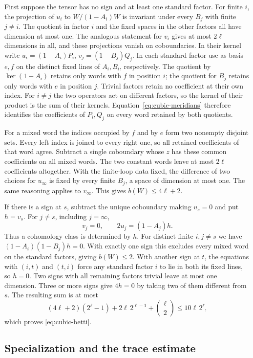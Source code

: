 \documentclass[preprint,12pt,numbers]{elsarticle}
\begin{document}
First suppose the tensor has no sign and at least one standard factor.
For finite $i$, the projection of $u_i$ to $W/(1-A_i)W$ is invariant
under every $B_j$ with finite $j\ne i$. The quotient in factor $i$ and
the fixed spaces in the other factors all have dimension at most one.
The analogous statement for $v_i$ gives at most $2\ell$ dimensions in
all, and these projections vanish on coboundaries. In their kernel
write $u_i=(1-A_i)P_i$, $v_j=(1-B_j)Q_j$. In each standard factor use
as basis $e,f$ on the distinct fixed lines of $A_i,B_i$, respectively.
The quotient by $\ker(1-A_i)$ retains only words with $f$ in position
$i$; the quotient for $B_j$ retains only words with $e$ in position $j$.
Trivial factors retain no coefficient at their own index. For $i\ne j$
the two operators act on different factors, so the kernel of their
product is the sum of their kernels. Equation~\eqref{eq:cubic-meridians}
therefore identifies the coefficients of $P_i,Q_j$ on every word
retained by both quotients.

For a mixed word the indices occupied by $f$ and by $e$ form two
nonempty disjoint sets. Every left index is joined to every right one,
so all retained coefficients of that word agree. Subtract a single
coboundary whose $z$ has these common coefficients on all mixed words.
The two constant words leave at most $2\ell$ coefficients altogether.
With the finite-loop data fixed, the difference of two choices for
$u_\infty$ is fixed by every finite $B_j$, a space of dimension at most
one. The same reasoning applies to $v_\infty$. This gives $b(W)\le4\ell+2$.

If there is a sign at $s$, subtract the unique coboundary making
$u_s=0$ and put $h=v_s$. For $j\ne s$, including $j=\infty$,
\[
          v_j=0,\qquad 2u_j=(1-A_j)h.
\]
Thus a cohomology class is determined by $h$. For distinct finite
$i,j\ne s$ we have $(1-A_i)(1-B_j)h=0$. With exactly one sign this
excludes every mixed word on the standard factors, giving $b(W)\le2$.
With another sign at $t$, the equations with $(i,t)$ and $(t,i)$ force
any standard factor $i$ to lie in both its fixed lines, so $h=0$.
Two signs with all remaining factors trivial leave at most one
dimension. Three or more signs give $4h=0$ by taking two of them
different from $s$. The resulting sum is at most
\[
 (4\ell+2)(2^\ell-1)+2\ell\,2^{\ell-1}+\binom{\ell}{2}
 \le 10\ell\,2^\ell ,
\]
which proves \eqref{eq:cubic-betti}.

\subsection{Specialization and the trace estimate}
\end{document}
